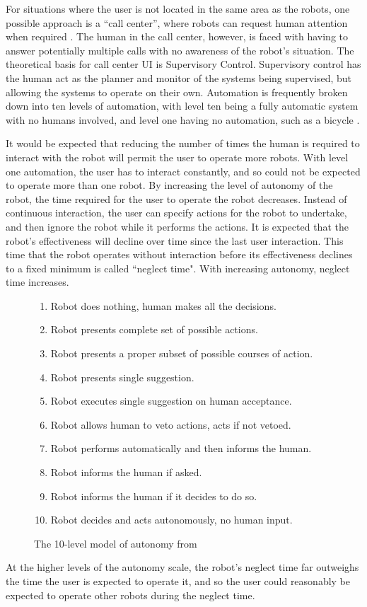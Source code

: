 For situations where the user is not located in the same area as the robots, one possible approach is a ``call center'', where robots can request human attention when required \citep{chen2011supervisory}. 
The human in the call center, however, is faced with having to answer potentially multiple calls with no awareness of the robot's situation. 
The theoretical basis for call center UI is Supervisory Control. 
Supervisory control has the human act as the planner and monitor of the systems being supervised, but allowing the systems to operate on their own.
Automation is frequently broken down into ten levels of automation, with level ten being a fully automatic system with no humans involved, and level one having no automation, such as a bicycle \citep{parasuraman2000model}. 

It would be expected that reducing the number of times the human is required to interact with the robot will permit the user to operate more robots.
With level one automation, the user has to interact constantly, and so could not be expected to operate more than one robot. 
By increasing the level of autonomy of the robot, the time required for the user to operate the robot decreases.
Instead of continuous interaction, the user can specify actions for the robot to undertake, and then ignore the robot while it performs the actions.
It is expected that the robot's effectiveness will decline over time since the last user interaction. 
This time that the robot operates without interaction before its effectiveness declines to a fixed minimum is called ``neglect time"\citep{olsen2003metrics}.
With increasing autonomy, neglect time increases.

\begin{figure}
	\begin{enumerate}[noitemsep]
		\item Robot does nothing, human makes all the decisions.
		\item Robot presents complete set of possible actions.
		\item Robot presents a proper subset of possible courses of action.
		\item Robot presents single suggestion.
		\item Robot executes single suggestion on human acceptance.
		\item Robot allows human to veto actions, acts if not vetoed.
		\item Robot performs automatically and then informs the human.
		\item Robot informs the human if asked.
		\item Robot informs the human if it decides to do so.
		\item Robot decides and acts autonomously, no human input.
	\end{enumerate}
	\caption{The 10-level model of autonomy from \citep{parasuraman2000model}}
\end{figure}
At the higher levels of the autonomy scale, the robot's neglect time far outweighs the time the user is expected to operate it, and so the user could reasonably be expected to operate other robots during the neglect time. 

